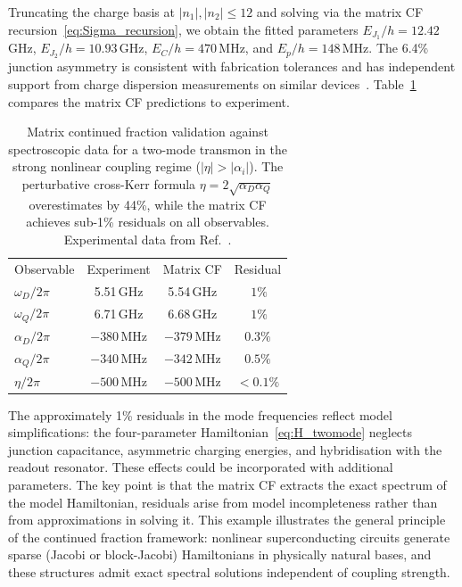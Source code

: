 \documentclass[reprint, floatfix, superscriptaddress, amsmath, amssymb, longbibliography]{revtex4-2}
\begin{document}
Truncating the charge basis at $|n_1|, |n_2| \leq 12$ and solving via the matrix CF recursion~\eqref{eq:Sigma_recursion}, we obtain the fitted parameters $E_{J_1}/h = 12.42$\,GHz, $E_{J_2}/h = 10.93$\,GHz, $E_C/h = 470$\,MHz, and $E_p/h = 148$\,MHz. The 6.4\% junction asymmetry is consistent with fabrication tolerances and has independent support from charge dispersion measurements on similar devices~\cite{Wills2022}. Table~\ref{tab:twomode_validation} compares the matrix CF predictions to experiment. 
\begin{table}[t]
\caption{Matrix continued fraction validation against spectroscopic data for a two-mode transmon in the strong nonlinear coupling regime ($|\eta| > |\alpha_i|$). The perturbative cross-Kerr formula $\eta = 2\sqrt{\alpha_D \alpha_Q}$ overestimates by 44\%, while the matrix CF achieves sub-1\% residuals on all observables. Experimental data from Ref.~\cite{Wills2022}.}
\label{tab:twomode_validation}
\begin{ruledtabular}
\begin{tabular}{lccc}
Observable & Experiment & Matrix CF & Residual \\
\colrule
$\omega_D/2\pi$ & 5.51\,GHz & 5.54\,GHz & $~1\%$ \\
$\omega_Q/2\pi$ & 6.71\,GHz & 6.68\,GHz & $~1\%$ \\
$\alpha_D/2\pi$ & $-380$\,MHz & $-379$\,MHz & $0.3\%$ \\
$\alpha_Q/2\pi$ & $-340$\,MHz & $-342$\,MHz & $0.5\%$ \\
$\eta/2\pi$ & $-500$\,MHz & $-500$\,MHz & $<0.1\%$ \\
\end{tabular}
\end{ruledtabular}
\end{table}
The approximately 1\% residuals in the mode frequencies reflect model simplifications: the four-parameter Hamiltonian~\eqref{eq:H_twomode} neglects junction capacitance, asymmetric charging energies, and hybridisation with the readout resonator. These effects could be incorporated with additional parameters. The key point is that the matrix CF extracts the exact spectrum of the model Hamiltonian, residuals arise from model incompleteness rather than from approximations in solving it. This example illustrates the general principle of the continued fraction framework: nonlinear superconducting circuits generate sparse (Jacobi or block-Jacobi) Hamiltonians in physically natural bases, and these structures admit exact spectral solutions independent of coupling strength.
\end{document}
